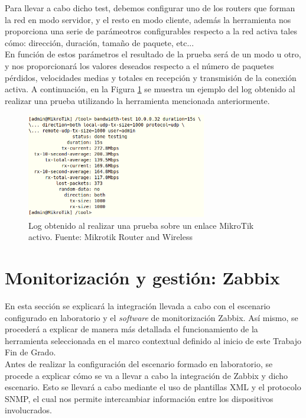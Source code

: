 Para llevar a cabo dicho test, debemos configurar uno de los routers que forman la red en modo servidor, y el resto en modo cliente, además la herramienta nos proporciona una serie de parámeotros configurables respecto a la red activa tales cómo: dirección, duración, tamaño de paquete, etc... \\
En función de estos parámetros el resultado de la prueba será de un modo u otro, y nos proporcionará los valores deseados respecto a el número de paquetes pérdidos, velocidades medias y totales en recepción y transmisión de la conexión activa. A continuación, en la Figura \ref{logTest} se muestra un ejemplo del log obtenido al realizar una prueba utilizando la herramienta mencionada anteriormente.

\begin{figure}[H]
	\centering
	\includegraphics[width=0.7\textwidth]{img/log_test.png}
	\caption{Log obtenido al realizar una prueba sobre un enlace MikroTik activo. Fuente: Mikrotik Router and Wireless}
	\label{logTest}
\end{figure}

\section{Monitorización y gestión: Zabbix}
En esta sección se explicará la integración llevada a cabo con el escenario configurado en laboratorio y el \textit{software} de monitorización Zabbix. Así mismo, se procederá a explicar de manera más detallada el funcionamiento de la herramienta seleccionada en el marco contextual definido al inicio de este Trabajo Fin de Grado.\\

Antes de realizar la configuración del escenario formado en laboratorio, se procede a explicar cómo se va a llevar a cabo la integración de Zabbix y dicho escenario. Esto se llevará a cabo mediante el uso de plantillas XML y el protocolo SNMP, el cual nos permite intercambiar información entre los dispositivos involucrados.\\
 
